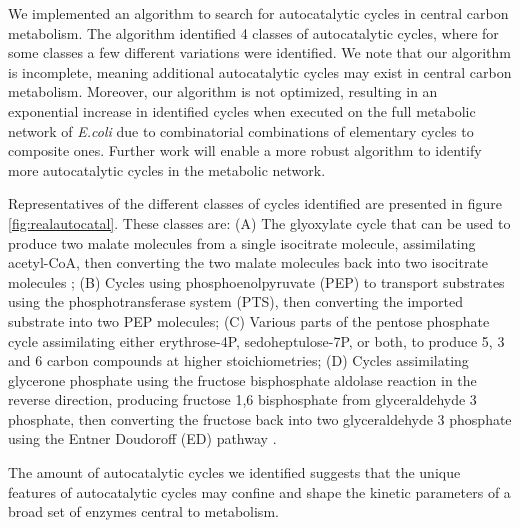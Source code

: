 \documentclass[a4page,notitlepage]{article}
\begin{document}
We implemented an algorithm to search for autocatalytic cycles in central carbon metabolism.
The algorithm identified 4 classes of autocatalytic cycles, where for some classes a few different variations were identified.
We note that our algorithm is incomplete, meaning additional autocatalytic cycles may exist in central carbon metabolism.
Moreover, our algorithm is not optimized, resulting in an exponential increase in identified cycles when executed on the full metabolic network of \emph{E.coli} due to combinatorial combinations of elementary cycles to composite ones.
Further work will enable a more robust algorithm to identify more autocatalytic cycles in the metabolic network.

Representatives of the different classes of cycles identified  are presented in figure \ref{fig:realautocatal}.
These classes are:
(A) The glyoxylate cycle that can be used to produce two malate molecules from a single isocitrate molecule, assimilating acetyl-CoA, then converting the two malate molecules back into two isocitrate molecules \cite{Kornberg1966-lh};
(B) Cycles using phosphoenolpyruvate (PEP) to transport substrates using the phosphotransferase system (PTS), then converting the imported substrate into two PEP molecules;
(C) Various parts of the pentose phosphate cycle assimilating either erythrose-4P, sedoheptulose-7P, or both, to produce 5, 3 and 6 carbon compounds at higher stoichiometries;
(D) Cycles assimilating glycerone phosphate using the fructose bisphosphate aldolase reaction in the reverse direction, producing fructose 1,6 bisphosphate from glyceraldehyde 3 phosphate, then converting the fructose back into two glyceraldehyde 3 phosphate using the Entner Doudoroff (ED) pathway \cite{Entner1952-xs}.

The amount of autocatalytic cycles we identified suggests that the unique features of autocatalytic cycles may confine and shape the kinetic parameters of a broad set of enzymes central to metabolism.
\end{document}
